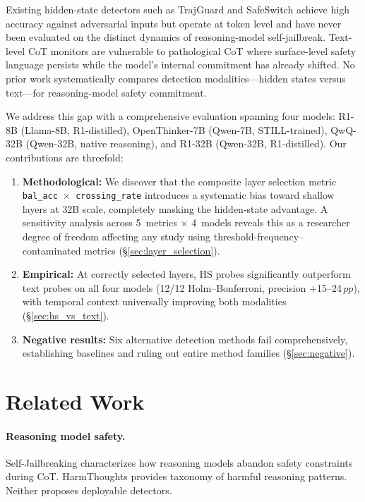 \documentclass[11pt,a4paper]{article}
\newcommand{\pp}{\,pp}
\begin{document}
Existing hidden-state detectors such as TrajGuard \cite{zhang2025trajguard} and SafeSwitch achieve high accuracy against adversarial inputs but operate at token level and have never been evaluated on the distinct dynamics of reasoning-model self-jailbreak.
Text-level CoT monitors \cite{wang2025safeRemind,zheng2025safeThink} are vulnerable to pathological CoT where surface-level safety language persists while the model's internal commitment has already shifted.
No prior work systematically compares detection modalities---hidden states versus text---for reasoning-model safety commitment.

We address this gap with a comprehensive evaluation spanning four models: R1-8B (Llama-8B, R1-distilled), OpenThinker-7B (Qwen-7B, STILL-trained), QwQ-32B (Qwen-32B, native reasoning), and R1-32B (Qwen-32B, R1-distilled).
Our contributions are threefold:

\begin{enumerate}[nosep,leftmargin=*]
\item \textbf{Methodological:} We discover that the composite layer selection metric \texttt{bal\_acc $\times$ crossing\_rate} introduces a systematic bias toward shallow layers at 32B scale, completely masking the hidden-state advantage.
A sensitivity analysis across 5~metrics $\times$ 4~models reveals this as a researcher degree of freedom affecting any study using threshold-frequency--contaminated metrics (\S\ref{sec:layer_selection}).
\item \textbf{Empirical:} At correctly selected layers, HS probes significantly outperform text probes on all four models (12/12 Holm--Bonferroni, precision $+$15--24$\pp$), with temporal context universally improving both modalities (\S\ref{sec:hs_vs_text}).
\item \textbf{Negative results:} Six alternative detection methods fail comprehensively, establishing baselines and ruling out entire method families (\S\ref{sec:negative}).
\end{enumerate}

\section{Related Work}
\label{sec:related}

\paragraph{Reasoning model safety.}
Self-Jailbreaking \cite{huang2025selfJailbreaking} characterizes how reasoning models abandon safety constraints during CoT.
HarmThoughts \cite{wen2025harmThoughts} provides taxonomy of harmful reasoning patterns.
Neither proposes deployable detectors.
\end{document}
